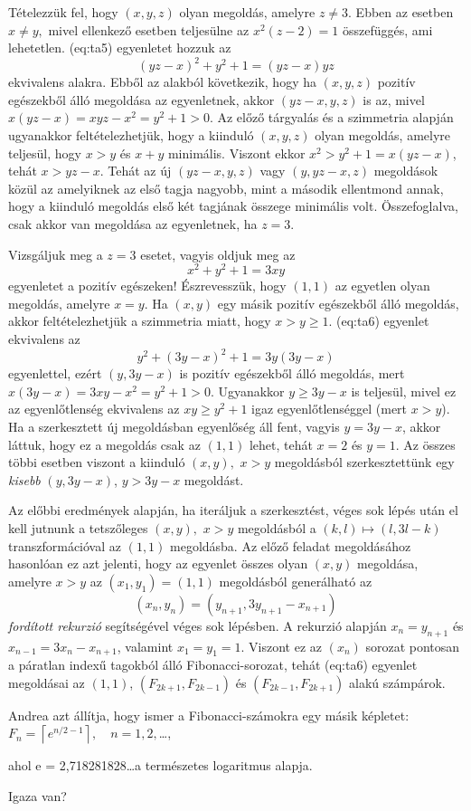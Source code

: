 \begin{solution}
Tételezzük fel, hogy $(x,y,z)$ olyan megoldás, amelyre $z\ne3$.
Ebben az esetben $x\ne y,$ mivel ellenkező esetben teljesülne az
$x^{2}(z-2)=1$ összefüggés, ami lehetetlen. \Aref({eq:ta5}) egyenletet
hozzuk az 
\[
(yz-x)^{2}+y^{2}+1=(yz-x)yz
\]
ekvivalens alakra. Ebből az alakból következik, hogy ha $(x,y,z)$
pozitív egészekből álló megoldása az egyenletnek, akkor $(yz-x,y,z)$
is az, mivel $x(yz-x)=xyz-x^{2}=y^{2}+1>0$. Az előző tárgyalás és
a szimmetria alapján ugyanakkor feltételezhetjük, hogy a kiinduló
$(x,y,z)$ olyan megoldás, amelyre teljesül, hogy $x>y$ és $x+y$
minimális. Viszont ekkor $x^{2}>y^{2}+1=x(yz-x)$, tehát $x>yz-x$.
Tehát az új $(yz-x,y,z)$ vagy $(y,yz-x,z)$ megoldások közül az amelyiknek
az első tagja nagyobb, mint a második ellentmond annak, hogy a kiinduló
megoldás első két tagjának összege minimális volt. Összefoglalva,
csak akkor van megoldása az egyenletnek, ha $z=3.$

Vizsgáljuk meg a $z=3$ esetet, vagyis oldjuk meg az 
\begin{equation}
x^{2}+y^{2}+1=3xy\label{eq:ta6}
\end{equation}
egyenletet a pozitív egészeken! Észrevesszük, hogy $(1,1)$ az egyetlen
olyan megoldás, amelyre $x=y$. Ha $(x,y)$ egy másik pozitív egészekből
álló megoldás, akkor feltételezhetjük a szimmetria miatt, hogy $x>y\ge1$.
\Aref({eq:ta6}) egyenlet ekvivalens az 
\[
y^{2}+(3y-x)^{2}+1=3y(3y-x)
\]
egyenlettel, ezért $(y,3y-x)$ is pozitív egészekből álló megoldás,
mert $x(3y-x)=3xy-x^{2}=y^{2}+1>0$. Ugyanakkor $y\ge3y-x$ is teljesül,
mivel ez az egyenlőtlenség ekvivalens az $xy\ge y^{2}+1$ igaz egyenlőtlenséggel
(mert $x>y$). Ha a szerkesztett új megoldásban egyenlőség áll fent,
vagyis $y=3y-x$, akkor láttuk, hogy ez a megoldás csak az $(1,1)$
lehet, tehát $x=2$ és $y=1$. Az összes többi esetben viszont a kiinduló
$(x,y),$ $x>y$ megoldásból szerkesztettünk egy \emph{kisebb} $(y,3y-x)$,
$y>3y-x$ megoldást.

Az előbbi eredmények alapján, ha iteráljuk a szerkesztést, véges sok
lépés után el kell jutnunk a tetszőleges $(x,y),$ $x>y$ megoldásból
a $(k,l)\mapsto(l,3l-k)$ transzformációval az $(1,1)$ megoldásba.
Az előző feladat megoldásához hasonlóan ez azt jelenti, hogy az egyenlet
összes olyan $(x,y)$ megoldása, amelyre $x>y$ az $(x_{1},y_{1})=(1,1)$
megoldásból generálható az 
\[
(x_{n},y_{n})=(y_{n+1},3y_{n+1}-x_{n+1})
\]
\emph{fordított rekurzió} segítségével véges sok lépésben. A rekurzió
alapján $x_{n}=y_{n+1}$ és $x_{n-1}=3x_{n}-x_{n+1}$, valamint $x_{1}=y_{1}=1.$
Viszont ez az $(x_{n})$ sorozat pontosan a páratlan indexű tagokból
álló Fibonacci-sorozat, tehát \aref({eq:ta6}) egyenlet megoldásai
az $(1,1)$, $(F_{2k+1},F_{2k-1})$ és $(F_{2k-1},F_{2k+1})$ alakú
számpárok. 
\end{solution}
\begin{extraproblem}
Andrea azt állítja, hogy ismer a Fibonacci-számokra egy másik képletet:
$F_{n}=\left\lceil e^{n/2-1}\right\rceil ,\quad n=1,2,$\ldots ,

ahol e = 2{,}718281828\ldots a természetes logaritmus alapja.

Igaza van? 
\end{extraproblem}

